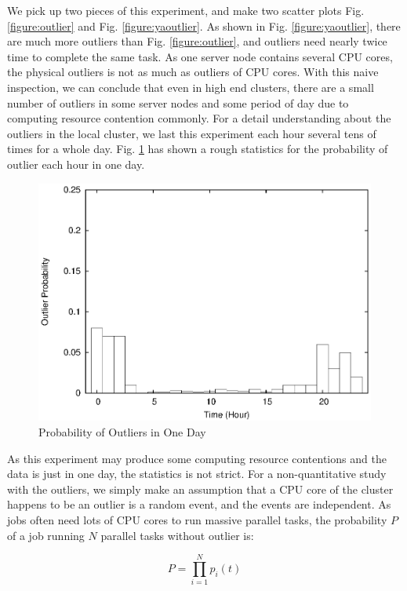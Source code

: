 We pick up two pieces of this experiment, and make two scatter plots Fig. \ref{figure:outlier} and Fig. \ref{figure:yaoutlier}. As shown in Fig. \ref{figure:yaoutlier}, there are much more outliers than Fig. \ref{figure:outlier}, and outliers need nearly twice time to complete the same task. As one server node contains several CPU cores, the physical outliers is not as much as outliers of CPU cores. With this naive inspection, we can conclude that even in high end clusters, there are a small number of outliers in some server nodes and some period of day due to computing resource contention commonly. For a detail understanding about the outliers in the local cluster, we last this experiment each hour several tens of times for a whole day. Fig. \ref{figure:outlier_stats} has shown a rough statistics for the probability of outlier each hour in one day.

\begin{figure}
\centering
\includegraphics[width=0.9\columnwidth]{figures/outlier_stats.eps}
\caption{Probability of Outliers in One Day}
\label{figure:outlier_stats}
\end{figure}

As this experiment may produce some computing resource contentions and the data is just in one day, the statistics is not strict. For a non-quantitative study with the outliers, we simply make an assumption that a CPU core of the cluster happens to be an outlier is a random event, and the events are independent. As jobs often need lots of CPU cores to run massive parallel tasks, the probability $P$ of a job running $N$ parallel tasks without outlier is:

$$P = \prod_{i=1}^N p_i(t)$$

